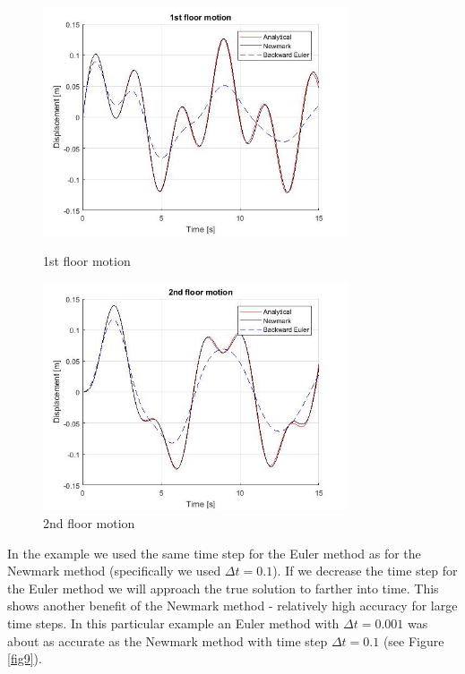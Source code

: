 \documentclass{article}
\begin{document}
				\begin{figure}[h!]
  					\centering
 				 	\begin{minipage}[b]{0.4\textwidth}
    						\includegraphics[width=90mm]{1floor.jpg}
						\caption{1st floor motion}
						\label{fig7}
  					\end{minipage}
 					 \hfill
					\begin{minipage}[b]{0.4\textwidth}
 				  	 	\includegraphics[width=90mm]{2floor.jpg}
						\caption{2nd floor motion}
						\label{fig8}
 					 \end{minipage}
				\end{figure}
In the example we used the same time step for the Euler method as for the Newmark method (specifically we used $\Delta t = 0.1$). If we decrease the time step for the Euler method we will approach the true solution to farther into time. This shows another benefit of the Newmark method - relatively high accuracy for large time steps. In this particular example an Euler method with $\Delta t = 0.001$ was about as accurate as the Newmark method with time step $\Delta t = 0.1$ (see Figure \ref{fig9}). 
\end{document}
